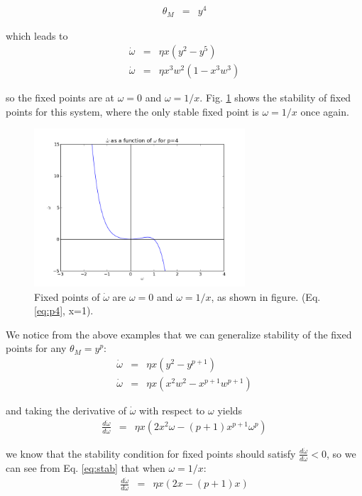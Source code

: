 \begin{eqnarray}
\theta_M &=& y^4
\end{eqnarray}

which leads to
\begin{eqnarray}
\dot \omega &=& \eta x (y^2-y^5) \\
\dot \omega &=&  \eta x^3w^2(1-x^3w^3) \label{eq:p4}
\end{eqnarray}

so the fixed points are at $\omega = 0$ and $\omega =  1/x$. Fig. \ref{fig:p4} shows the stability of fixed points for this system, where the only stable fixed point is $\omega = 1/x$ once again.

\begin{figure}[h]
\centering
\includegraphics[width=0.7\textwidth]{./p4.png}
\caption{Fixed points of $\dot \omega$ are $\omega = 0$ and $\omega =  1/x$, as shown in figure. (Eq. \ref{eq:p4}, x=1).}
\label{fig:p4}
\end{figure}

We notice from the above examples that we can generalize stability of the fixed points for any $\theta_M = y^p$:
\begin{eqnarray}
\dot \omega &=& \eta x (y^2-y^{p+1}) \\
\dot \omega &=&  \eta x(x^2w^2-x^{p+1}w^{p+1}) \label{eq:general1}
\end{eqnarray}

and taking the derivative of $\dot \omega$ with respect to $\omega$ yields
\begin{eqnarray}
\frac{d\dot \omega}{d\omega} &=& \eta x (2x^2\omega-(p+1)x^{p+1}\omega^p) \label{eq:stab}
\end{eqnarray}

we know that the stability condition for fixed points should satisfy $\frac{d\dot \omega}{d\omega} <0$, so we can see from Eq. \ref{eq:stab} that when  $\omega = 1/x$:
\begin{eqnarray}
\frac{d\dot \omega}{d\omega} &=& \eta x (2x-(p+1)x)  \label{eq:ome}
\end{eqnarray}

